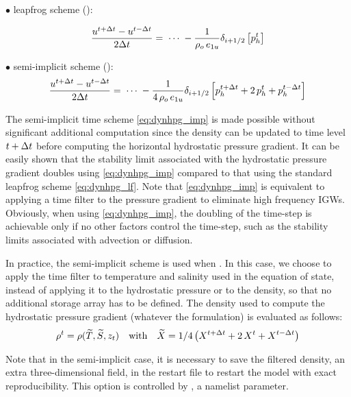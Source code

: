 \documentclass[../main/NEMO_manual]{subfiles}
\begin{document}
$\bullet$ leapfrog scheme ():

\begin{equation}
  \label{eq:dynhpg_lf}
  \frac{u^{t+\Delta t}-u^{t-\Delta t}}{2\Delta t} = \;\cdots \;
  -\frac{1}{\rho_o \,e_{1u} }\delta_{i+1/2} \left[ {p_h^t } \right]
\end{equation}

$\bullet$ semi-implicit scheme ():
\begin{equation}
  \label{eq:dynhpg_imp}
  \frac{u^{t+\Delta t}-u^{t-\Delta t}}{2\Delta t} = \;\cdots \;
  -\frac{1}{4\,\rho_o \,e_{1u} } \delta_{i+1/2} \left[ p_h^{t+\Delta t} +2\,p_h^t +p_h^{t-\Delta t}  \right]
\end{equation}

The semi-implicit time scheme \autoref{eq:dynhpg_imp} is made possible without
significant additional computation since the density can be updated to time level $t+\Delta t$ before
computing the horizontal hydrostatic pressure gradient.
It can be easily shown that the stability limit associated with the hydrostatic pressure gradient doubles using
\autoref{eq:dynhpg_imp} compared to that using the standard leapfrog scheme \autoref{eq:dynhpg_lf}.
Note that \autoref{eq:dynhpg_imp} is equivalent to applying a time filter to the pressure gradient to
eliminate high frequency IGWs.
Obviously, when using \autoref{eq:dynhpg_imp},
the doubling of the time-step is achievable only if no other factors control the time-step,
such as the stability limits associated with advection or diffusion.

In practice, the semi-implicit scheme is used when .
In this case, we choose to apply the time filter to temperature and salinity used in the equation of state,
instead of applying it to the hydrostatic pressure or to the density,
so that no additional storage array has to be defined.
The density used to compute the hydrostatic pressure gradient (whatever the formulation) is evaluated as follows:
\[
  \rho^t = \rho( \widetilde{T},\widetilde {S},z_t)
  \quad	  \text{with}	\quad
  \widetilde{X} = 1 / 4 \left(  X^{t+\Delta t} +2 \,X^t + X^{t-\Delta t}  \right)
\]

Note that in the semi-implicit case, it is necessary to save the filtered density,
an extra three-dimensional field, in the restart file to restart the model with exact reproducibility.
This option is controlled by  , a namelist parameter.
\end{document}
